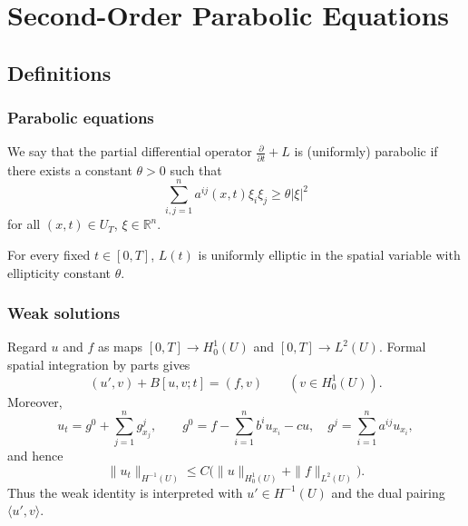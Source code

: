 
\section{Second-Order Parabolic Equations}
\label{sec:second-order-parabolic-equations}

\subsection{Definitions}

\subsubsection{Parabolic equations}

\begin{definition}
\label{def:uniform-parabolicity}
We say that the partial differential operator $\frac{\partial}{\partial t} + L$ is (uniformly) parabolic if there exists a constant $\theta > 0$ such that
\[
\sum_{i,j=1}^{n} a^{ij}(x,t)\xi_i \xi_j \geq \theta|\xi|^2
\tag{4}
\]
for all $(x,t) \in U_T$, $\xi \in \mathbb{R}^n$.
\end{definition}

\begin{remark}
\label{rem:parabolic-operator-elliptic-fixed-time}

For every fixed $t\in[0,T]$, $L(t)$ is uniformly elliptic in the spatial variable with ellipticity constant $\theta$.
\end{remark}

\subsubsection{Weak solutions}

\begin{remark}
\label{rem:motivation-weak-solution-parabolic}

Regard $u$ and $f$ as maps $[0,T]\to H_0^1(U)$ and $[0,T]\to L^2(U)$. Formal spatial integration by parts gives
\[
(u',v)+B[u,v;t]=(f,v) \qquad (v\in H_0^1(U)).
\tag{9}
\]
Moreover,
\[
u_t=g^0+\sum_{j=1}^n g^j_{x_j},\qquad
g^0=f-\sum_{i=1}^n b^iu_{x_i}-cu,\quad
g^j=\sum_{i=1}^n a^{ij}u_{x_i},
\tag{10}
\]
and hence
\[
\|u_t\|_{H^{-1}(U)}\le C\bigl(\|u\|_{H_0^1(U)}+\|f\|_{L^2(U)}\bigr).
\]
Thus the weak identity is interpreted with $u'\in H^{-1}(U)$ and the dual pairing $\langle u',v\rangle$.
\end{remark}

